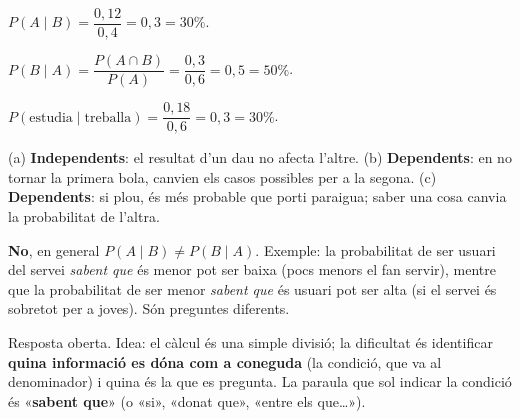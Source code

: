 \begin{solucions}
\begin{sollist}
  \item $P(A\mid B)=\dfrac{0,12}{0,4}=0,3=30\%$.
  \item $P(B\mid A)=\dfrac{P(A\cap B)}{P(A)}=\dfrac{0,3}{0,6}=0,5=50\%$.
  \item $P(\text{estudia}\mid\text{treballa})=\dfrac{0,18}{0,6}=0,3=30\%$.
  \item (a) \textbf{Independents}: el resultat d'un dau no afecta l'altre. \quad
        (b) \textbf{Dependents}: en no tornar la primera bola, canvien els casos
        possibles per a la segona. \quad (c) \textbf{Dependents}: si plou, és més
        probable que porti paraigua; saber una cosa canvia la probabilitat de l'altra.
  \item \textbf{No}, en general $P(A\mid B)\neq P(B\mid A)$. Exemple: la probabilitat de
        ser usuari del servei \emph{sabent que} és menor pot ser baixa (pocs menors el
        fan servir), mentre que la probabilitat de ser menor \emph{sabent que} és
        usuari pot ser alta (si el servei és sobretot per a joves). Són preguntes
        diferents.
  \item Resposta oberta. Idea: el càlcul és una simple divisió; la dificultat és
        identificar \textbf{quina informació es dóna com a coneguda} (la condició, que
        va al denominador) i quina és la que es pregunta. La paraula que sol indicar la
        condició és «\textbf{sabent que}» (o «si», «donat que», «entre els que\dots»).
\end{sollist}
\end{solucions}
